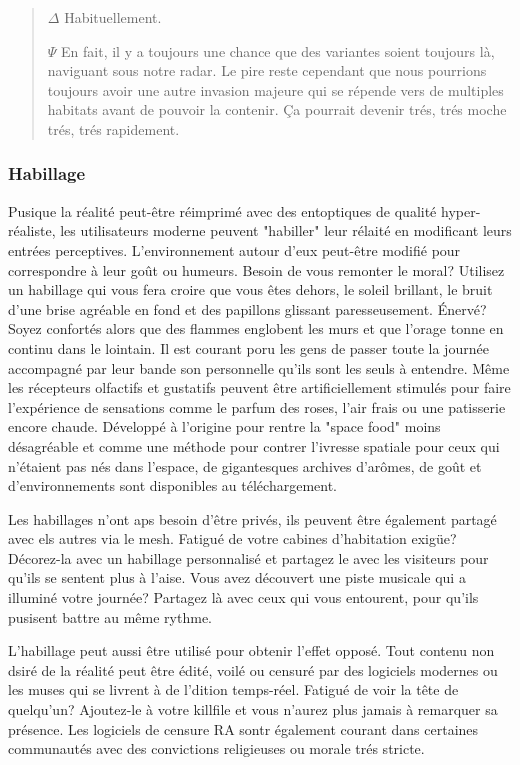 \begin{quotation}
$\Delta$ Habituellement. 

$\Psi$ En fait, il y a toujours une chance que des variantes soient toujours là, naviguant sous notre radar. Le pire reste cependant que nous pourrions toujours avoir une autre invasion majeure qui se répende vers de multiples habitats avant de pouvoir la contenir. Ça pourrait devenir trés, trés moche trés, trés rapidement. \end{quotation} 



\subsubsection{Habillage} 

Pusique la réalité peut-être réimprimé avec des entoptiques de qualité hyper-réaliste, les utilisateurs moderne peuvent "habiller" leur rélaité en modificant leurs entrées perceptives. L'environnement autour d'eux peut-être modifié pour correspondre à leur goût ou humeurs. Besoin de vous remonter le moral? Utilisez un habillage qui vous fera croire que vous êtes dehors, le soleil brillant, le bruit d'une brise agréable en fond et des papillons glissant paresseusement. Énervé? Soyez confortés alors que des flammes englobent les murs et que l'orage tonne en continu dans le lointain. Il est courant poru les gens de passer toute la journée accompagné par leur bande son personnelle qu'ils sont les seuls à entendre. Même les récepteurs olfactifs et gustatifs peuvent être artificiellement stimulés pour faire l'expérience de sensations comme le parfum des roses, l'air frais ou une patisserie encore chaude. Développé à l'origine pour rentre la "space food" moins désagréable et comme une méthode pour contrer l'ivresse spatiale pour ceux qui n'étaient pas nés dans l'espace, de gigantesques archives d'arômes, de goût  et d'environnements sont disponibles au téléchargement. 

Les habillages n'ont aps besoin d'être privés, ils peuvent être également partagé avec els autres via le mesh. Fatigué de votre cabines d'habitation exigüe? Décorez-la avec un habillage personnalisé et partagez le avec les visiteurs pour qu'ils se sentent plus à l'aise. Vous avez découvert une piste musicale qui a illuminé votre journée? Partagez là avec ceux qui vous entourent, pour qu'ils pusisent battre au même rythme. 

L'habillage peut aussi être utilisé pour obtenir l'effet opposé. Tout contenu non dsiré de la réalité peut être édité, voilé ou censuré par des logiciels modernes ou les muses qui se livrent à de l'dition temps-réel. Fatigué de voir la tête de quelqu'un? Ajoutez-le à votre killfile et vous n'aurez plus jamais à remarquer sa présence. Les logiciels de censure RA sontr également courant dans certaines communautés avec des convictions religieuses ou morale trés stricte. 

